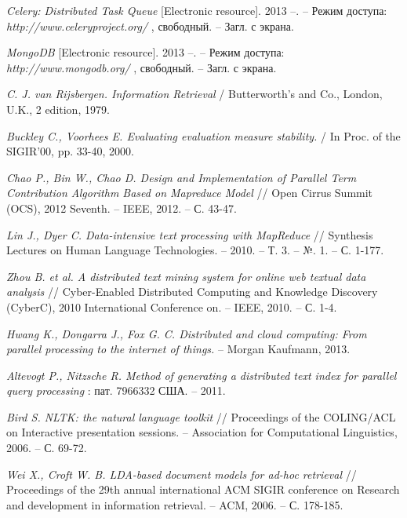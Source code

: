 \documentclass[12pt]{report}
\begin{document}
\begin{thebibliography}{99}
{\it  Celery: Distributed Task Queue } [Electronic resource]. 2013 --. -- Режим доступа: {\it
  http://www.celeryproject.org/ }, свободный. -- Загл. с экрана.

{\it  MongoDB  } [Electronic resource]. 2013 --. -- Режим доступа: {\it
  http://www.mongodb.org/ }, свободный. -- Загл. с экрана.


{\it  C. J. van Rijsbergen. Information Retrieval } / Butterworth's and Co., London, U.K., 2 edition, 1979.


{\it  Buckley C., Voorhees E. Evaluating evaluation measure stability. } /  In Proc. of the SIGIR'00, pp. 33-40, 2000. 


{\it Chao P., Bin W., Chao D. Design and Implementation of Parallel Term Contribution Algorithm Based on Mapreduce Model} // Open Cirrus Summit (OCS), 2012 Seventh. -- IEEE, 2012. -- С. 43-47.

{\it Lin J., Dyer C. Data-intensive text processing with MapReduce} // Synthesis Lectures on Human Language Technologies. -- 2010. -- Т. 3. -- №. 1. -- С. 1-177.

{\it Zhou B. et al. A distributed text mining system for online web textual data analysis} // Cyber-Enabled Distributed Computing and Knowledge Discovery (CyberC), 2010 International Conference on. -- IEEE, 2010. -- С. 1-4.

{\it Hwang K., Dongarra J., Fox G. C. Distributed and cloud computing: From parallel processing to the internet of things.} -- Morgan Kaufmann, 2013.

{\it Altevogt P., Nitzsche R. Method of generating a distributed text index for parallel query processing }: пат. 7966332 США. -- 2011.

{\it Bird S. NLTK: the natural language toolkit } // Proceedings of the COLING/ACL on Interactive presentation sessions. -- Association for Computational Linguistics, 2006. -- С. 69-72.

{\it Wei X., Croft W. B. LDA-based document models for ad-hoc retrieval} // Proceedings of the 29th annual international ACM SIGIR conference on Research and development in information retrieval. -- ACM, 2006. -- С. 178-185.


\end{thebibliography}

\end{document}
